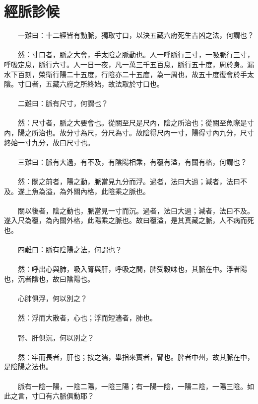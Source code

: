 \section{經脈診候}

　　一難曰：十二經皆有動脈，獨取寸口，以決五藏六府死生吉凶之法，何謂也？
\\\\
　　然：寸口者，脈之大會，手太陰之脈動也。人一呼脈行三寸，一吸脈行三寸，呼吸定息，脈行六寸。人一日一夜，凡一萬三千五百息，脈行五十度，周於身。漏水下百刻，榮衛行陽二十五度，行陰亦二十五度，為一周也，故五十度復會於手太陰。寸口者，五藏六府之所終始，故法取於寸口也。
\\\\
　　二難曰：脈有尺寸，何謂也？
\\\\
　　然：尺寸者，脈之大要會也。從關至尺是尺內，陰之所治也；從關至魚際是寸內，陽之所治也。故分寸為尺，分尺為寸。故陰得尺內一寸，陽得寸內九分，尺寸終始一寸九分，故曰尺寸也。
\\\\
　　三難曰：脈有大過，有不及，有陰陽相乘，有覆有溢，有關有格，何謂也？
\\\\
　　然：關之前者，陽之動，脈當見九分而浮。過者，法曰大過；減者，法曰不及。遂上魚為溢，為外關內格，此陰乘之脈也。
\\\\
　　關以後者，陰之動也，脈當見一寸而沉。過者，法曰大過；減者，法曰不及。遂入尺為覆，為內關外格，此陽乘之脈也。故曰覆溢，是其真藏之脈，人不病而死也。
\\\\
　　四難曰：脈有陰陽之法，何謂也？
\\\\
　　然：呼出心與肺，吸入腎與肝，呼吸之間，脾受穀味也，其脈在中。浮者陽也，沉者陰也，故曰陰陽也。
\\\\
　　心肺俱浮，何以別之？
\\\\
　　然：浮而大散者，心也；浮而短濇者，肺也。
\\\\
　　腎、肝俱沉，何以別之？
\\\\
　　然：牢而長者，肝也；按之濡，舉指來實者，腎也。脾者中州，故其脈在中，是陰陽之法也。
\\\\
　　脈有一陰一陽，一陰二陽，一陰三陽；有一陽一陰，一陽二陰，一陽三陰。如此之言，寸口有六脈俱動耶？
